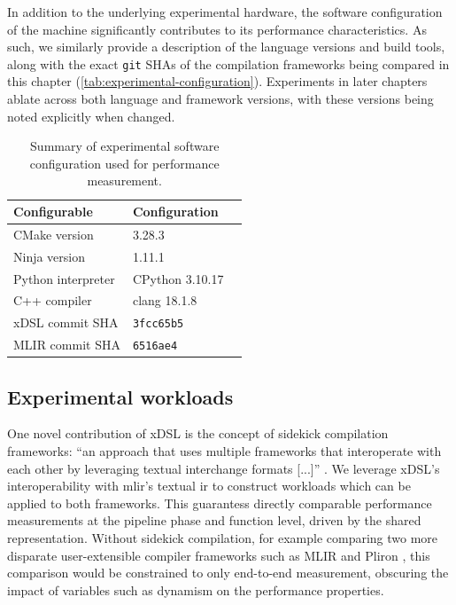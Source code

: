 In addition to the underlying experimental hardware, the software configuration of the machine significantly contributes to its performance characteristics.
As such, we similarly provide a description of the language versions and build tools, along with the exact \texttt{git} SHAs of the compilation frameworks being compared in this chapter (\autoref{tab:experimental-configuration}).
Experiments in later chapters ablate across both language and framework versions, with these versions being noted explicitly when changed.

\begin{table}[H]
  \caption{Summary of experimental software configuration used for performance measurement.}
  \label{tab:experimental-configuration}
  \centering
  \begin{tabular}{lll}
    \toprule
    \textbf{Configurable} & \textbf{Configuration} \\
    \midrule
    CMake version & 3.28.3 \\
    Ninja version & 1.11.1 \\
    \midrule
    Python interpreter & CPython 3.10.17 \\
    C++ compiler & clang 18.1.8 \\
    \midrule
    xDSL commit SHA & \texttt{3fcc65b5} \\
    MLIR commit SHA & \texttt{6516ae4} \\
    \bottomrule
  \end{tabular}
\end{table}


\subsection{Experimental workloads}
\label{ssec:experimental-workloads}

One novel contribution of xDSL is the concept of sidekick compilation frameworks: ``an approach that uses multiple frameworks that interoperate with each other by leveraging textual interchange formats [...]'' \cite{fehrXDSLSidekickCompilation2025}.
We leverage xDSL's interoperability with \ac{mlir}'s textual \ac{ir} to construct workloads which can be applied to both frameworks.
This guarantess directly comparable performance measurements at the pipeline phase and function level, driven by the shared representation.
Without sidekick compilation, for example comparing two more disparate user-extensible compiler frameworks such as MLIR and Pliron \cite{vaivaswathanagarajVaivaswathaPliron2025}, this comparison would be constrained to only end-to-end measurement, obscuring the impact of variables such as dynamism on the performance properties.

